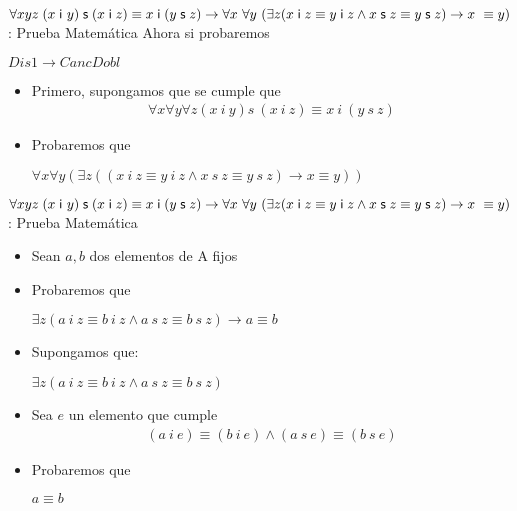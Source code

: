 \documentclass[10pt]{beamer}
\newcommand{\Cfonti}{\fontsize{8.5}{7.2}\selectfont}
\newcommand{\acot}{Dis1\rightarrow CancDobl}
\newcommand{\idistr}{\forall xyz\;(x\;\mathsf{i}\
y)\;\mathsf{s}\;(x\;\mathsf{i}\;z)\equiv x\;\mathsf{i}\;(y\;\mathsf{s}%
\;z)}
\newcommand{\myconj}{x\;\mathsf{i}\;z\equiv y\;\mathsf{%
i}\;z\wedge x\;\mathsf{s}\;z\equiv y\;\mathsf{s}\;z}
\begin{document}
\begin{frame}{\Cfonti$\idistr \rightarrow \forall x\ \forall y\ (\exists z (\myconj) \rightarrow x\ \equiv y)$:
   Prueba Matemática}
  Ahora si probaremos
  \begin{center}
    $\acot$
  \end{center}
  \pause
  \begin{itemize}[<+->]

    \item Primero, supongamos que se cumple que
    \begin{align}
      \forall x \forall y \forall z (x\ i\ y) s\ (x\ i\ z) \equiv x\ i\ (y\ s\ z) \label{eq11}
    \end{align}
    \item Probaremos que
    \begin{center}
      $\forall x \forall y (\exists z ((x\ i\ z \equiv y\ i\ z \wedge x\ s\ z \equiv y\ s\ z) \rightarrow x \equiv y))$
    \end{center}

  \end{itemize}
\end{frame}


\begin{frame}{\Cfonti$\idistr \rightarrow \forall x\ \forall y\ (\exists z (\myconj) \rightarrow x\ \equiv y)$:
   Prueba Matemática}
  \begin{itemize}[<+->]

    \item Sean $a, b$ dos elementos de A fijos
    \item Probaremos que
    \begin{center}
      $\exists z (a\ i\ z \equiv b\ i\ z \wedge a\ s\ z \equiv b\ s\ z) \rightarrow a \equiv b$
    \end{center}
    \item Supongamos que:
    \begin{center}
      $\exists z (a\ i\ z \equiv b\ i\ z \wedge a\ s\ z \equiv b\ s\ z)$
    \end{center}

    \item Sea $e$ un elemento que cumple
    \begin{align}
      (a\ i\ e) \equiv (b\ i\ e) \wedge (a\ s\ e) \equiv (b\ s\ e)
    \end{align}
    \item Probaremos que
    \begin{center}
      $a \equiv b$
    \end{center}
  \end{itemize}
\end{frame}
\end{document}
